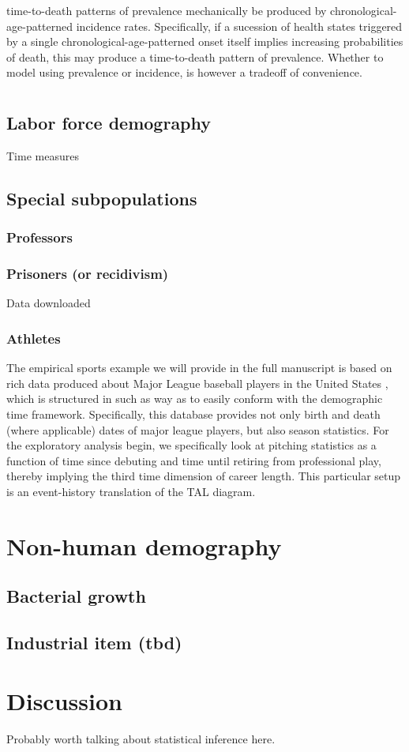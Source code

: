 \documentclass[11pt,oneside]{article} %
\begin{document}
		time-to-death patterns of prevalence mechanically be produced by
		chronological-age-patterned incidence rates. Specifically, if a sucession of
		health states triggered by a single chronological-age-patterned onset itself
		implies increasing probabilities of death, this may produce a time-to-death
		pattern of prevalence. Whether to model using prevalence or incidence, is
		however a tradeoff of convenience.

	
\section{}
	
	\subsection{Labor force demography}
	Time measures
	\subsection{Special subpopulations}
		\subsubsection{Professors}
		\subsubsection{Prisoners (or recidivism)}
		Data downloaded \citep{LSVCB}
		\subsubsection{Athletes}
		The empirical sports example we will provide in the full manuscript is based
		on rich data produced about Major League baseball players in the United States
\citep{Lahman}, which is structured in such as way as to easily conform with the
demographic time framework. Specifically, this database provides not only birth
and death (where applicable) dates of major league players, but also season
statistics. For the exploratory analysis begin, we specifically look at
pitching statistics as a function of time since debuting and time until retiring
from professional play, thereby implying the third time dimension of career
length. This particular setup is an event-history translation of the TAL
diagram.
\section{Non-human demography}	
	\subsection{Bacterial growth}
	\subsection{Industrial item (tbd)}
	
\section{Discussion}
Probably worth talking about statistical inference here.



\singlespacing

   
\end{document}
